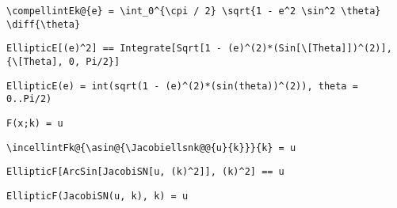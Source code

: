 \newsavebox\ACST
\begin{lrbox}{\ACST}
 \begin{minipage}[t]{0.82\textwidth}
  \lstinline[language={[latex]TeX},mathescape,breaklines=true]"\compellintEk@{e} = \int_0^{\cpi / 2} \sqrt{1 - e^2 \sin^2 \theta} \diff{\theta}"
 \end{minipage}
\end{lrbox}
\newsavebox\ACMM
\begin{lrbox}{\ACMM}
 \begin{minipage}[t]{0.82\textwidth}
  \lstinline[language={[latex]TeX},mathescape,breaklines=true]"EllipticE[(e)^2] == Integrate[Sqrt[1 - (e)^(2)*(Sin[\[Theta]])^(2)], {\[Theta], 0, Pi/2}]"
 \end{minipage}
\end{lrbox}
\newsavebox\ACMA
\begin{lrbox}{\ACMA}
 \begin{minipage}[t]{0.82\textwidth}
  \lstinline[language={[latex]TeX},mathescape,breaklines=true]"EllipticE(e) = int(sqrt(1 - (e)^(2)*(sin(theta))^(2)), theta = 0..Pi/2)"
 \end{minipage}
\end{lrbox}
\newsavebox\ADT
\begin{lrbox}{\ADT}
 \begin{minipage}[t]{0.82\textwidth}
  \lstinline[language={[latex]TeX},mathescape,breaklines=true]"F(x;k) = u"
 \end{minipage}
\end{lrbox}
\newsavebox\ADST
\begin{lrbox}{\ADST}
 \begin{minipage}[t]{0.82\textwidth}
  \lstinline[language={[latex]TeX},mathescape,breaklines=true]"\incellintFk@{\asin@{\Jacobiellsnk@@{u}{k}}}{k} = u"
 \end{minipage}
\end{lrbox}
\newsavebox\ADMM
\begin{lrbox}{\ADMM}
 \begin{minipage}[t]{0.82\textwidth}
  \lstinline[language={[latex]TeX},mathescape,breaklines=true]"EllipticF[ArcSin[JacobiSN[u, (k)^2]], (k)^2] == u"
 \end{minipage}
\end{lrbox}
\newsavebox\ADMA
\begin{lrbox}{\ADMA}
 \begin{minipage}[t]{0.82\textwidth}
  \lstinline[language={[latex]TeX},mathescape,breaklines=true]"EllipticF(JacobiSN(u, k), k) = u"
 \end{minipage}
\end{lrbox}
